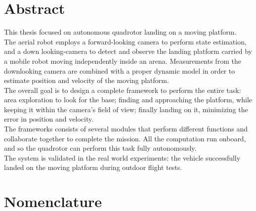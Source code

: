 
 \setcounter{tocdepth}{2}
 \tableofcontents
 \cleardoublepage






\chapter*{Abstract}
This thesis focused on autonomous quadrotor landing on a moving platform.\\
The aerial robot employs a forward-looking camera to perform state estimation, and a down looking-camera
to detect and observe the landing platform carried by a mobile robot moving independently inside an arena. Measurements from the downlooking camera are combined with a proper dynamic model in order to estimate position and velocity of the moving platform.\\
The overall goal is to design a complete framework to perform the entire task: area exploration to look for the base; finding and approaching the platform, while keeping it within the camera's field of view; finally landing on it, minimizing the error in position and velocity.\\
The frameworks consists of several modules that perform different functions and collaborate together to complete the mission. All the computation run onboard, and so the quadrotor can perform this task fully autonomously.\\
The system is validated in the real world experiments: the vehicle successfully landed on the moving platform during outdoor flight tests.
 \cleardoublepage


\chapter*{Nomenclature}\label{chap:symbole}

